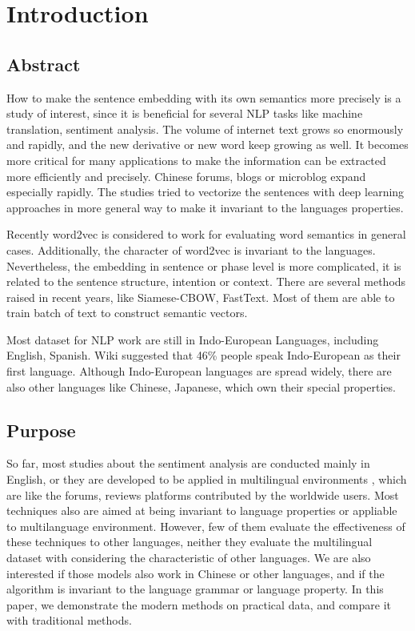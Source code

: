 \chapter{Introduction}
\setlength{\baselineskip}{1.5em}
\setlength{\parindent}{2em}
\setlength{\parskip}{1em}

\section{Abstract}

How to make the sentence embedding with its own semantics more precisely is a study of interest, since it is beneficial for several NLP tasks like machine translation, sentiment analysis. 
The volume of internet text grows so enormously and rapidly, and the new derivative or new word keep growing as well.
It becomes more critical for many applications to make the information can be extracted more efficiently and precisely.  
Chinese forums, blogs or microblog expand especially rapidly. The studies tried to vectorize the sentences with deep learning approaches in more general way to make it invariant to the languages properties.  


Recently word2vec\cite{word2vec} is considered to work for evaluating word semantics in general cases.  
Additionally, the character of word2vec is invariant to the languages. Nevertheless, 
the embedding in sentence or phase level is more complicated, it is related to the sentence structure,  
intention or context. There are several methods raised in recent years, like Siamese-CBOW, FastText. 
Most of them are able to train batch of text to construct semantic vectors.

Most dataset for NLP work are still in Indo-European Languages, including English, Spanish. Wiki suggested that 46\% people speak Indo-European as their first language. 
Although Indo-European languages are spread widely, there are also other languages like Chinese, Japanese, which own their special properties.

\section{Purpose}

So far, most studies about the sentiment analysis are conducted mainly in English, or they are developed to be applied in multilingual environments
, which are like the forums, reviews platforms contributed by the worldwide users. Most techniques also are aimed at being invariant to language properties or appliable to multilanguage environment. 
However, few of them evaluate the effectiveness of these techniques to other languages, neither they evaluate the multilingual dataset with considering the characteristic of other languages.   
We are also interested if those models also work in Chinese or other languages, and if the algorithm is invariant to the language grammar or language property. 
In this paper, we demonstrate the modern methods on practical data, and compare it with traditional methods.